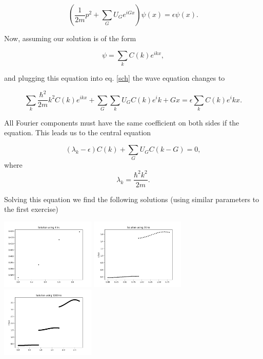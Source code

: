 \begin{questions}
\begin{solution}
\begin{equation}
  \left(\frac{1}{2m}p^2 + \sum_G U_Ge^{iGx}\right) \psi(x) = \epsilon \psi(x).
  \label{sch}
\end{equation}

Now, assuming our solution is of the form

\begin{equation}
  \psi = \sum_k C(k)e^{ikx},
\end{equation}

and plugging this equation into eq. \ref{sch} the wave equation changes to

\begin{equation}
  \sum_k \frac{\hbar^2}{2m}k^2 C(k)e^{ikx} + \sum_G \sum_k U_GC(k)e^i{k+G}x = \epsilon \sum_k C(k)e^ikx.
\end{equation}

All Fourier components must have the same coefficient on both sides if the equation. This leads us to the central equation

\begin{equation}
  (\lambda_k -\epsilon)C(k) + \sum_G U_GC(k-G) = 0,
  \label{central}
\end{equation}
where
\begin{equation}
  \lambda_k = \frac{\hbar^2 k^2}{2m}.
\end{equation}

Solving this equation we find the following solutions (using similar parameters to the first exercise)
%
\begin{center}
  \includegraphics[width=45mm]{num4}
  \includegraphics[width=45mm]{num20}
  \includegraphics[width=45mm]{num1000}
\end{center}


\end{solution}
\end{questions}

